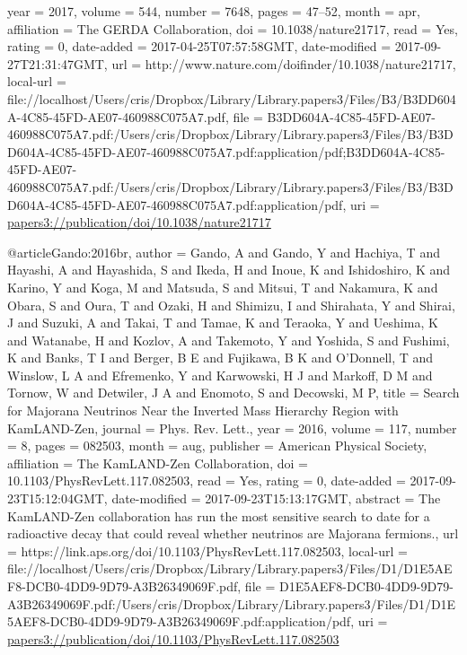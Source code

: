 {{{year = {2017},
volume = {544},
number = {7648},
pages = {47--52},
month = apr,
affiliation = {The GERDA Collaboration},
doi = {10.1038/nature21717},
read = {Yes},
rating = {0},
date-added = {2017-04-25T07:57:58GMT},
date-modified = {2017-09-27T21:31:47GMT},
url = {http://www.nature.com/doifinder/10.1038/nature21717},
local-url = {file://localhost/Users/cris/Dropbox/Library/Library.papers3/Files/B3/B3DD604A-4C85-45FD-AE07-460988C075A7.pdf},
file = {{B3DD604A-4C85-45FD-AE07-460988C075A7.pdf:/Users/cris/Dropbox/Library/Library.papers3/Files/B3/B3DD604A-4C85-45FD-AE07-460988C075A7.pdf:application/pdf;B3DD604A-4C85-45FD-AE07-460988C075A7.pdf:/Users/cris/Dropbox/Library/Library.papers3/Files/B3/B3DD604A-4C85-45FD-AE07-460988C075A7.pdf:application/pdf}},
uri = {\url{papers3://publication/doi/10.1038/nature21717}}
}

@article{Gando:2016br,
author = {Gando, A and Gando, Y and Hachiya, T and Hayashi, A and Hayashida, S and Ikeda, H and Inoue, K and Ishidoshiro, K and Karino, Y and Koga, M and Matsuda, S and Mitsui, T and Nakamura, K and Obara, S and Oura, T and Ozaki, H and Shimizu, I and Shirahata, Y and Shirai, J and Suzuki, A and Takai, T and Tamae, K and Teraoka, Y and Ueshima, K and Watanabe, H and Kozlov, A and Takemoto, Y and Yoshida, S and Fushimi, K and Banks, T I and Berger, B E and Fujikawa, B K and O{\textquoteright}Donnell, T and Winslow, L A and Efremenko, Y and Karwowski, H J and Markoff, D M and Tornow, W and Detwiler, J A and Enomoto, S and Decowski, M P},
title = {{Search for Majorana Neutrinos Near the Inverted Mass Hierarchy Region with KamLAND-Zen}},
journal = {Phys. Rev. Lett.},
year = {2016},
volume = {117},
number = {8},
pages = {082503},
month = aug,
publisher = {American Physical Society},
affiliation = {The KamLAND-Zen Collaboration},
doi = {10.1103/PhysRevLett.117.082503},
read = {Yes},
rating = {0},
date-added = {2017-09-23T15:12:04GMT},
date-modified = {2017-09-23T15:13:17GMT},
abstract = {The KamLAND-Zen collaboration has run the most sensitive search to date for a radioactive decay that could reveal whether neutrinos are Majorana fermions.},
url = {https://link.aps.org/doi/10.1103/PhysRevLett.117.082503},
local-url = {file://localhost/Users/cris/Dropbox/Library/Library.papers3/Files/D1/D1E5AEF8-DCB0-4DD9-9D79-A3B26349069F.pdf},
file = {{D1E5AEF8-DCB0-4DD9-9D79-A3B26349069F.pdf:/Users/cris/Dropbox/Library/Library.papers3/Files/D1/D1E5AEF8-DCB0-4DD9-9D79-A3B26349069F.pdf:application/pdf}},
uri = {\url{papers3://publication/doi/10.1103/PhysRevLett.117.082503}}
}

}}
